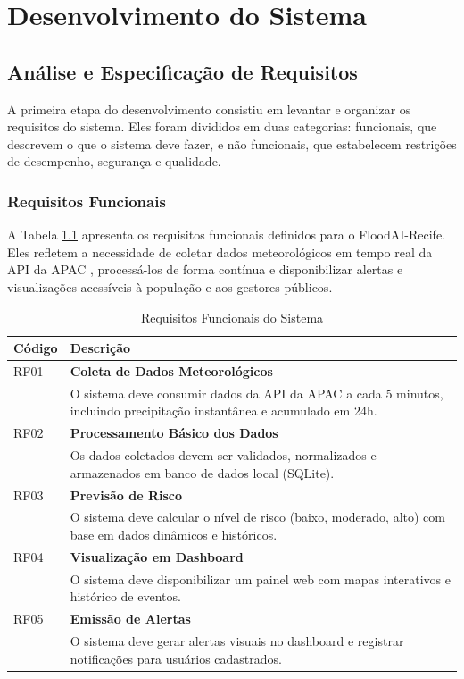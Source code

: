 \chapter{Desenvolvimento do Sistema}

\section{Análise e Especificação de Requisitos}

A primeira etapa do desenvolvimento consistiu em levantar e organizar os requisitos do sistema. Eles foram divididos em duas categorias: funcionais, que descrevem o que o sistema deve fazer, e não funcionais, que estabelecem restrições de desempenho, segurança e qualidade.

\subsection{Requisitos Funcionais}

A Tabela \ref{tab:requisitos-funcionais} apresenta os requisitos funcionais definidos para o FloodAI-Recife. Eles refletem a necessidade de coletar dados meteorológicos em tempo real da API da APAC \cite{alves_apac}, processá-los de forma contínua e disponibilizar alertas e visualizações acessíveis à população e aos gestores públicos.

\begin{table}[H]
\centering
\caption{Requisitos Funcionais do Sistema}
\label{tab:requisitos-funcionais}
\begin{tabular}{p{}p{}}
\toprule
\textbf{Código} & \textbf{Descrição} \\
\midrule
RF01 & \textbf{Coleta de Dados Meteorológicos} \\
& O sistema deve consumir dados da API da APAC a cada 5 minutos, incluindo precipitação instantânea e acumulado em 24h. \\
\midrule
RF02 & \textbf{Processamento Básico dos Dados} \\
& Os dados coletados devem ser validados, normalizados e armazenados em banco de dados local (SQLite). \\
\midrule
RF03 & \textbf{Previsão de Risco} \\
& O sistema deve calcular o nível de risco (baixo, moderado, alto) com base em dados dinâmicos e históricos. \\
\midrule
RF04 & \textbf{Visualização em Dashboard} \\
& O sistema deve disponibilizar um painel web com mapas interativos e histórico de eventos. \\
\midrule
RF05 & \textbf{Emissão de Alertas} \\
& O sistema deve gerar alertas visuais no dashboard e registrar notificações para usuários cadastrados. \\
\bottomrule
\end{tabular}
\end{table}

